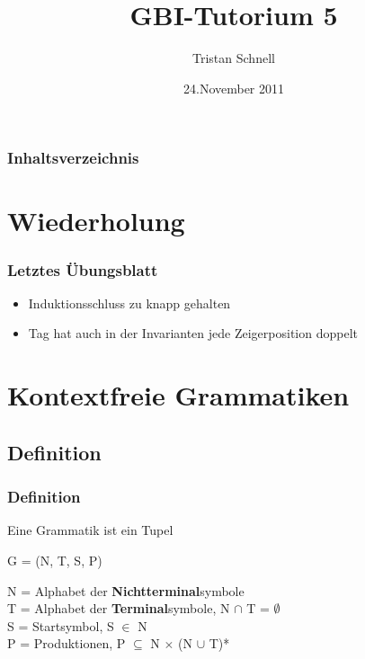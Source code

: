 \documentclass{beamer}
\author{Tristan Schnell}
\title{GBI-Tutorium 5}
\date{24.November 2011}
\begin{document}
\begin {frame}
	\titlepage
\end {frame}

\begin {frame}
	\frametitle {Inhaltsverzeichnis}
	\tableofcontents
\end {frame}

\section{Wiederholung}

\begin{frame}
	\frametitle{Letztes \"Ubungsblatt}
		\begin{itemize}
			\item Induktionsschluss zu knapp gehalten
			\item Tag hat auch in der Invarianten jede Zeigerposition doppelt
		\end{itemize}
\end{frame}

\section{Kontextfreie Grammatiken} 
\subsection[Definition]{Definition}

\begin{frame}
	\frametitle{Definition}
	Eine Grammatik ist ein Tupel
	\pause
		\begin{center}
			G = (N, T, S, P)
		\end{center}
	\pause
	\begin{block}{ }
			 N = Alphabet der \textbf{Nichtterminal}symbole \\
			 T = Alphabet der \textbf{Terminal}symbole, N $\cap$ T = $\emptyset$ \\
			 S = Startsymbol, S $\in$ N \\
			 P = Produktionen, P $\subseteq$ N $\times$  (N $\cup$ T)* 


	\end{block}	

\end{frame}
\end{document}
